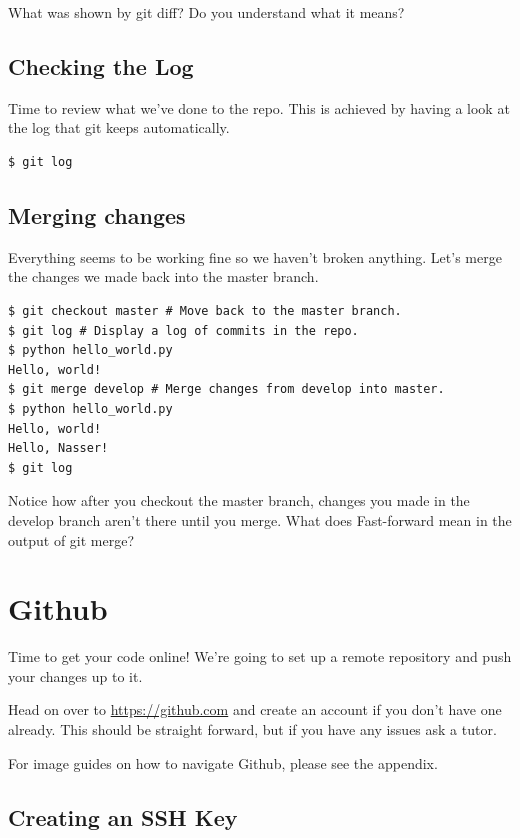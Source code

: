 \documentclass{tufte-handout}
\begin{document}
\noindent What was shown by git diff? Do you understand what it means?

\subsection{Checking the Log}

\noindent Time to review what we've done to the repo. This is achieved by having a look at the log that git keeps automatically.

\begin{lstlisting}
$ git log
\end{lstlisting}

\subsection{Merging changes}
\noindent Everything seems to be working fine so we haven't broken anything. Let's merge the changes we made back into the master branch.

\begin{lstlisting}
$ git checkout master # Move back to the master branch.
$ git log # Display a log of commits in the repo.
$ python hello_world.py
Hello, world!
$ git merge develop # Merge changes from develop into master.
$ python hello_world.py
Hello, world!
Hello, Nasser!
$ git log
\end{lstlisting}

\noindent Notice how after you checkout the master branch, changes you made in the develop branch aren't there until you merge. What does Fast-forward mean in the output of git merge?

\section{Github}

\noindent Time to get your code online! We're going to set up a remote repository and push your changes up to it.

\noindent Head on over to \url{https://github.com} and create an account if you don't have one already. This should be straight forward, but if you have any issues ask a tutor.

\noindent For image guides on how to navigate Github, please see the appendix.

\pagebreak

\subsection{Creating an SSH Key}
\end{document}
